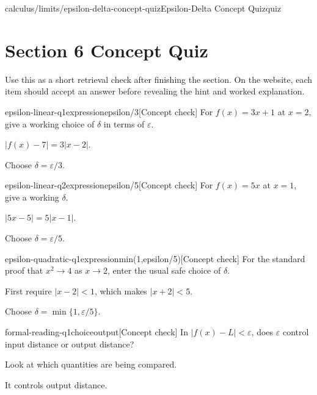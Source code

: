 \begin{webpage}{calculus/limits/epsilon-delta-concept-quiz}{Epsilon-Delta Concept Quiz}{quiz}
\section*{Section 6 Concept Quiz}

Use this as a short retrieval check after finishing the section. On the website, each item should accept an answer before revealing the hint and worked explanation.

\begin{bgcheck}{epsilon-linear-q1}{expression}{epsilon/3}[Concept check]
For \(f(x)=3x+1\) at \(x=2\), give a working choice of \(\delta\) in terms of \(\varepsilon\).
\begin{bghint}
\(|f(x)-7|=3|x-2|\).
\end{bghint}
\begin{bgreveal}
Choose \(\delta=\varepsilon/3\).
\end{bgreveal}
\end{bgcheck}

\begin{bgcheck}{epsilon-linear-q2}{expression}{epsilon/5}[Concept check]
For \(f(x)=5x\) at \(x=1\), give a working \(\delta\).
\begin{bghint}
\(|5x-5|=5|x-1|\).
\end{bghint}
\begin{bgreveal}
Choose \(\delta=\varepsilon/5\).
\end{bgreveal}
\end{bgcheck}

\begin{bgcheck}{epsilon-quadratic-q1}{expression}{min(1,epsilon/5)}[Concept check]
For the standard proof that \(x^2\to4\) as \(x\to2\), enter the usual safe choice of \(\delta\).
\begin{bghint}
First require \(|x-2|<1\), which makes \(|x+2|<5\).
\end{bghint}
\begin{bgreveal}
Choose \(\delta=\min\{1,\varepsilon/5\}\).
\end{bgreveal}
\end{bgcheck}

\begin{bgcheck}{formal-reading-q1}{choice}{output}[Concept check]
In \(|f(x)-L|<\varepsilon\), does \(\varepsilon\) control input distance or output distance?
\begin{bghint}
Look at which quantities are being compared.
\end{bghint}
\begin{bgreveal}
It controls output distance.
\end{bgreveal}
\end{bgcheck}


\end{webpage}

